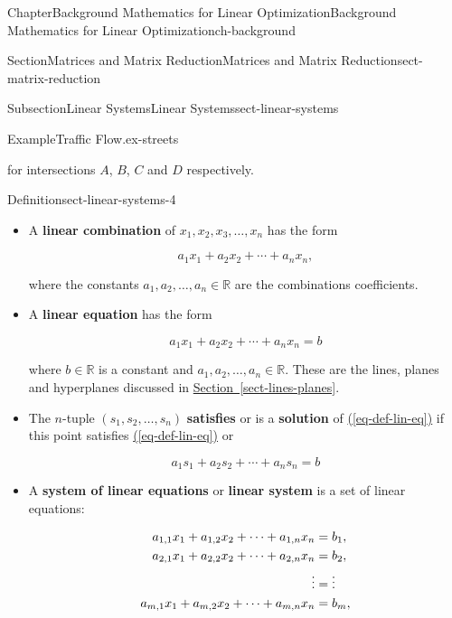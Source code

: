 \documentclass[oneside,10pt,]{book}
\newcommand{\xreffont}{\relax}
\newcommand{\terminology}[1]{\textbf{#1}}
\numberwithin{equation}{section}
\newcommand{\amp}{&}
\begin{document}
\begin{chapterptx}{Chapter}{Background Mathematics for Linear Optimization}{}{Background Mathematics for Linear Optimization}{}{}{ch-background}
\begin{sectionptx}{Section}{Matrices and Matrix Reduction}{}{Matrices and Matrix Reduction}{}{}{sect-matrix-reduction}
\begin{subsectionptx}{Subsection}{Linear Systems}{}{Linear Systems}{}{}{sect-linear-systems}
\begin{example}{Example}{Traffic Flow.}{ex-streets}
\begin{equation}
\end{equation}
%
\par
for intersections \(A\), \(B\), \(C\) and \(D\) respectively.%
\end{example}
\begin{definition}{Definition}{}{sect-linear-systems-4}%
%
\begin{itemize}[label=\textbullet]
\item{}A \terminology{linear combination} of \(x_1, x_2, x_3, \ldots, x_n\) has the form%
\par
%
\begin{equation*}
a_1 x_1 + a_2 x_2 + \cdots + a_n x_n,
\end{equation*}
%
\par
where the constants \(a_1, a_2, \ldots, a_n \in \mathbb{R}\) are the combinations coefficients.%
\item{}A \terminology{linear equation} has the form%
\par
%
\begin{equation}
a_1 x_1 + a_2 x_2 + \cdots + a_n x_n = b\label{eq-def-lin-eq}
\end{equation}
%
\par
where \(b \in \mathbb{R}\) is a constant and \(a_1, a_2, \ldots, a_n \in \mathbb{R}\). These are the lines, planes and hyperplanes discussed in \hyperref[sect-lines-planes]{Section~{\xreffont\ref{sect-lines-planes}}}.%
\item{}The \(n\)-tuple \((s_1,s_2,\ldots,s_n)\) \terminology{satisfies} or is a \terminology{solution} of \hyperref[eq-def-lin-eq]{({\xreffont\ref{eq-def-lin-eq}})} if this point satisfies \hyperref[eq-def-lin-eq]{({\xreffont\ref{eq-def-lin-eq}})} or%
\par
%
\begin{equation*}
a_1 s_1 + a_2 s_2 + \cdots + a_n s_n = b
\end{equation*}
%
\item{}A \terminology{system of linear equations} or \terminology{linear system} is a set of linear equations:%
\par
%
\begin{align}
a_{1,1} x_1 + a_{1,2} x_2 + \cdots + a_{1,n} x_n \amp = b_1 , \notag\\
a_{2,1} x_1 + a_{2,2} x_2 + \cdots + a_{2,n} x_n \amp = b_2, \label{eq-def-lin-sys}\\
\vdots \amp = \vdots \notag\\
a_{m,1} x_1 + a_{m,2} x_2 + \cdots + a_{m,n} x_n \amp = b_m, \notag
\end{align}

\end{itemize}
\end{definition}
\end{subsectionptx}
\end{sectionptx}
\end{chapterptx}
\end{document}
